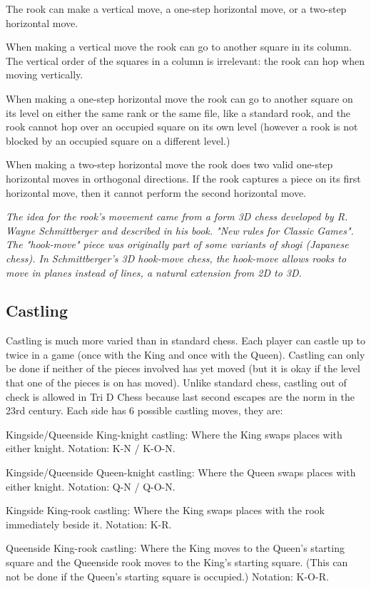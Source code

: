 \documentclass[12pt]{article} %
\begin{document}
The rook can make a vertical move, a one-step horizontal move, or a two-step horizontal move.

When making a vertical move the rook can go to another square in its column.  The vertical order of the squares in a column is irrelevant: the rook can hop when moving vertically.

When making a one-step horizontal move the rook can go to another square on its level on either the same rank or the same file, like a standard rook, and the rook cannot hop over an occupied square on its own level (however a rook is not blocked by an occupied square on a different level.)

When making a two-step horizontal move the rook does two valid one-step horizontal moves in orthogonal directions.  If the rook captures a piece on its first horizontal move, then it cannot perform the second horizontal move.

\textit{The idea for the rook's movement came from a form 3D chess developed by R. Wayne Schmittberger and described in his book. "New rules for Classic Games".  The "hook-move" piece was originally part of some variants of shogi (Japanese chess).  In Schmittberger's 3D hook-move chess, the hook-move allows rooks to move in planes instead of lines, a natural extension from 2D to 3D.}


\subsection{Castling}

Castling is much more varied than in standard chess.  Each player can castle up to twice in a game (once with the King and once with the Queen).  Castling can only be done if neither of the pieces involved has yet moved (but it is okay if the level that one of the pieces is on has moved).  Unlike standard chess, castling out of check is allowed in Tri D Chess because last second escapes are the norm in the 23rd century.  Each side has 6 possible castling moves, they are:

Kingside/Queenside King-knight castling: 
Where the King swaps places with either knight.  
Notation: K-N / K-O-N.

Kingside/Queenside Queen-knight castling: 
Where the Queen swaps places with either knight.  
Notation: Q-N / Q-O-N.

Kingside King-rook castling: 
Where the King swaps places with the rook immediately beside it.
Notation: K-R.

Queenside King-rook castling: 
Where the King moves to the Queen's starting square and the Queenside rook moves to the King's starting square.  (This can not be done if the Queen's starting square is occupied.)  
Notation: K-O-R.
\end{document}
